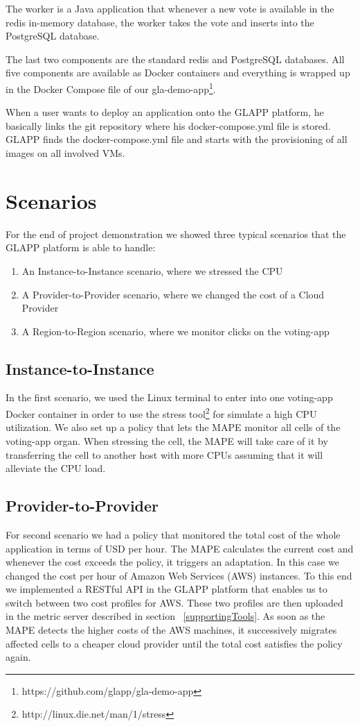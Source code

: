 \documentclass{seal_thesis}
\begin{document}
The worker is a Java application that whenever a new vote is available in the redis in-memory database, the worker takes the vote and inserts into the PostgreSQL database.

The last two components are the standard redis and PostgreSQL databases.
All five components are available as Docker containers and everything is wrapped up in the Docker Compose file of our gla-demo-app\footnote{https://github.com/glapp/gla-demo-app}.

When a user wants to deploy an application onto the GLAPP platform, he basically links the git repository where his docker-compose.yml file is stored.
GLAPP finds the docker-compose.yml file and starts with the provisioning of all images on all involved VMs.

\section{Scenarios}
For the end of project demonstration we showed three typical scenarios that the GLAPP platform is able to handle:
\begin{enumerate}
	\item An Instance-to-Instance scenario, where we stressed the CPU
	\item A Provider-to-Provider scenario, where we changed the cost of a Cloud Provider
	\item A Region-to-Region scenario, where we monitor clicks on the voting-app
\end{enumerate}

\subsection{Instance-to-Instance}

In the first scenario, we used the Linux terminal to enter into one voting-app Docker container in order to use the stress tool\footnote{http://linux.die.net/man/1/stress} for simulate a high CPU utilization.
We also set up a policy that lets the MAPE monitor all cells of the voting-app organ. When stressing the cell, the MAPE will take care of it by transferring the cell to another host with more CPUs assuming that it will alleviate the CPU load.

\subsection{Provider-to-Provider}

For second scenario we had a policy that monitored the total cost of the whole application in terms of USD per hour.
The MAPE calculates the current cost and whenever the cost exceeds the policy, it triggers an adaptation.
In this case we changed the cost per hour of Amazon Web Services (AWS) instances.
To this end we implemented a RESTful API in the GLAPP platform that enables us to switch between two cost profiles for AWS.
These two profiles are then uploaded in the metric server described in section ~\ref{supportingTools}.
As soon as the MAPE detects the higher costs of the AWS machines, it successively migrates affected cells to a cheaper cloud provider until the total cost satisfies the policy again.
\end{document}
